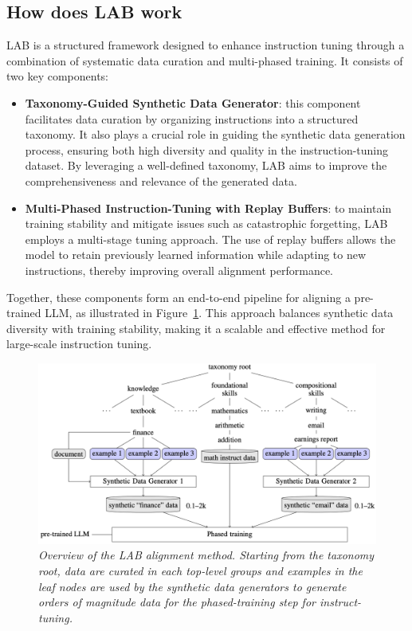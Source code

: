 \documentclass[12pt]{article}
\begin{document}
\subsection{How does LAB work}
LAB is a structured framework designed to enhance instruction tuning through a combination of systematic data curation and multi-phased training. It consists of two key components:
\begin{itemize}
    \item \textbf{Taxonomy-Guided Synthetic Data Generator}: this component facilitates data curation by organizing instructions into a structured taxonomy. It also plays a crucial role in guiding the synthetic data generation process, ensuring both high diversity and quality in the instruction-tuning dataset. By leveraging a well-defined taxonomy, LAB aims to improve the comprehensiveness and relevance of the generated data.
    \item \textbf{Multi-Phased Instruction-Tuning with Replay Buffers}: to maintain training stability and mitigate issues such as catastrophic forgetting, LAB employs a multi-stage tuning approach. The use of replay buffers allows the model to retain previously learned information while adapting to new instructions, thereby improving overall alignment performance.
\end{itemize}
Together, these components form an end-to-end pipeline for aligning a pre-trained LLM, as illustrated in Figure~\ref{fig:ilab}. This approach balances synthetic data diversity with training stability, making it a scalable and effective method for large-scale instruction tuning.
\begin{figure}
    \centering
    \includegraphics[width=1\textwidth]{img/figure1.png}
    \caption{\textit{Overview of the LAB alignment method. Starting from the taxonomy root, data are curated in each top-level groups and examples in the leaf nodes are used by the synthetic data generators to generate orders of magnitude data for the phased-training step for instruct-tuning.}}
    \label{fig:ilab}
\end{figure}
\end{document}
